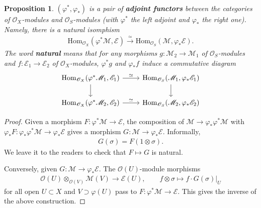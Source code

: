 \documentclass[12pt,b5paper,notitlepage]{report}
\theoremstyle{definition}
\theoremstyle{plain}
\newtheorem{pp}[df]{Proposition}
\newcommand{\Hom}{\mathrm{Hom}}
\newcommand{\scr}{\mathscr}
\numberwithin{equation}{section}
\begin{document}
\begin{pp}\label{lb337}
$(\varphi^*,\varphi_*)$ is a pair of \textbf{adjoint functors} between the categories of $\scr O_X$-modules and $\scr O_S$-modules  (with $\varphi^*$ the left adjoint and $\varphi_*$ the right one). Namely, there is a natural isomphism
\begin{align}
\Hom_{\scr O_X}(\varphi^*\scr M,\scr E)\xrightarrow{\simeq}\Hom_{\scr O_S}(\scr M,\varphi_*\scr E).
\end{align}
The word \textbf{natural}  means that for any morphisms $g:\scr M_2\rightarrow\scr M_1$ of $\scr O_S$-modules and $f:\scr E_1\rightarrow\scr E_2$ of $\scr O_X$-modules, $\varphi^*g$ and $\varphi_*f$ induce a commutative diagram
\begin{equation}
\begin{tikzcd}
\Hom_{\scr O_X}(\varphi^*\scr M_1,\scr E_1) \arrow[d] \arrow[r,"\simeq"] & \Hom_{\scr O_S}(\scr M_1,\varphi_*\scr E_1) \arrow[d] \\
\Hom_{\scr O_X}(\varphi^*\scr M_2,\scr E_2) \arrow[r,"\simeq"]           & \Hom_{\scr O_S}(\scr M_2,\varphi_*\scr E_2)          
\end{tikzcd}
\end{equation}
\end{pp}

\begin{proof}
Given a morphism $F:\varphi^*\scr M\rightarrow\scr E$, the composition of $\scr M\rightarrow\varphi_*\varphi^*\scr M$ with $\varphi_*F:\varphi_*\varphi^*\scr M\rightarrow\varphi_*\scr E$ gives a morphism $G:\scr M\rightarrow\varphi_*\scr E$. Informally,
\begin{align}
G(\sigma)=F(1\otimes\sigma).
\end{align}
We leave it to the readers to check that $F\mapsto G$ is natural.

Conversely, given $G:\scr M\rightarrow\varphi_*\scr E$. The $\scr O(U)$-module morphisms
\begin{gather*}
\scr O(U)\otimes_{\scr O(V)}\scr M(V)\rightarrow\scr E(U),\qquad f\otimes\sigma\mapsto f\cdot G(\sigma)|_U
\end{gather*}
for all open $U\subset X$ and $V\supset \varphi(U)$ pass to $F:\varphi^*\scr M\rightarrow\scr E$. This gives the inverse of the above construction.
\end{proof}
\end{document}
